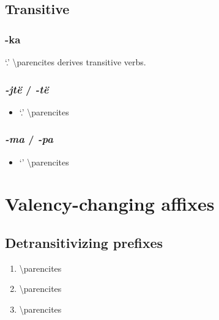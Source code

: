 \documentclass{memoir}
\begin{document}
\subsection{Transitive}

\subsubsection{\texorpdfstring{-ka \label{sec:kavbz}}{-ka }}

 `.' \textbackslash parencites derives
transitive verbs.

\subsubsection{\texorpdfstring{\emph{-jtë} / \emph{-të}
\label{sec:jtevbz}}{-jtë / -të }}

\begin{itemize}
\tightlist
\item
   `.' \textbackslash parencites
\end{itemize}

\subsubsection{\texorpdfstring{\emph{-ma} / \emph{-pa}
\label{sec:macaus}}{-ma / -pa }}

\begin{itemize}
\tightlist
\item
   `' \textbackslash parencites
\end{itemize}

\section{Valency-changing affixes}

\subsection{\texorpdfstring{Detransitivizing prefixes
\label{sec:detrz}}{Detransitivizing prefixes }}

\begin{enumerate}
\def\labelenumi{\arabic{enumi}.}
\tightlist
\item
   \textbackslash parencites
\item
   \textbackslash parencites
\item
   \textbackslash parencites
\end{enumerate}
\end{document}

